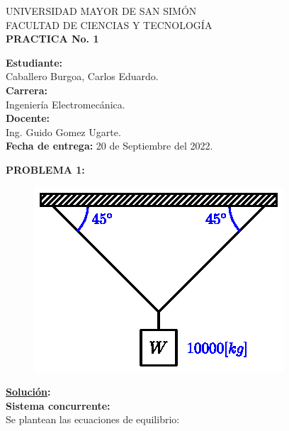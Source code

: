 \documentclass[letter,10pt,twoside]{article}
\newcommand{\blankpage}{
\newpage
\thispagestyle{empty}
\mbox{}
\newpage
}
\begin{document}
\begin{titlepage}
\begin{center}
{\Large UNIVERSIDAD MAYOR DE SAN SIMÓN}\\
\vspace*{0.15cm}
{\large FACULTAD DE CIENCIAS Y TECNOLOGÍA}\\
\vspace*{9.0cm}
{\Large \textbf{PRACTICA No. 1}}\\
\end{center}

\vspace*{7.4cm}
\leftskip=7.95cm
\noindent
\textbf{Estudiante:}\\
Caballero Burgoa, Carlos Eduardo.\\
\textbf{Carrera:}\\
Ingeniería Electromecánica.\\
\newline
\textbf{Docente:}\\
Ing. Guido Gomez Ugarte.\\
\newline
\textbf{Fecha de entrega:} 20 de Septiembre del 2022.\\

\end{titlepage}

\blankpage

\colorbox{blue!25}{\textbf{PROBLEMA 1:}}

\begin{figure}[H]
\centering
\includegraphics[scale=1.3]{resources/f01.eps}
\end{figure}

\textbf{\underline{Solución}:} \\

\textbf{Sistema concurrente:} \\
Se plantean las ecuaciones de equilibrio:
\end{document}

